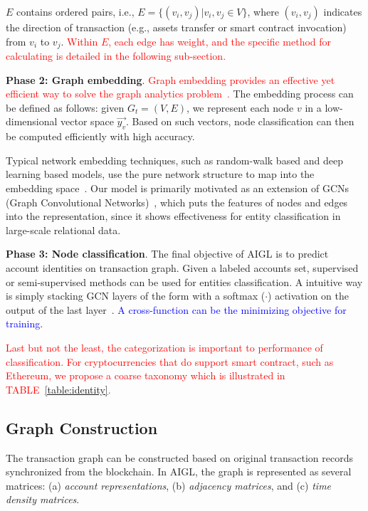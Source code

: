 $E$ contains ordered pairs, i.e., $E=\{(v_i,v_j)|v_i,v_j \in V\}$, where $(v_{i},v_{j})$ indicates the direction of transaction (e.g., assets transfer or smart contract invocation) from $v_i$ to $v_j$. \textcolor{red}{Within $E$, each edge has weight, and the specific method for calculating is detailed in the following sub-section.}


\textbf{Phase 2: Graph embedding}.
\textcolor{red}{Graph embedding provides an effective yet efficient way to solve the graph analytics problem~\cite{cai2018comprehensive}.} The embedding process can be defined as follows: given $G_{t}=(V,E)$, we represent each node $v$ in a low-dimensional vector space $\vec{y_v}$. Based on such vectors, node classification can then be computed efficiently with high accuracy.

Typical network embedding techniques, such as random-walk based and deep learning based models, use the pure network structure to map into the embedding space~\cite{goyal2018capturing}. Our model is primarily motivated as an extension of GCNs (Graph Convolutional Networks)~\cite{kipf2016semi,schlichtkrull2018modeling}, which puts the features of nodes and edges into the representation, since it shows effectiveness for entity classification in large-scale relational data.


\textbf{Phase 3: Node classification}.
The final objective of AIGL is to predict account identities on transaction graph. Given a labeled accounts set, supervised or semi-supervised methods can be used for entities classification. A intuitive way is simply stacking GCN layers of the form with a softmax ($\cdot$) activation on the output of the last layer~\cite{schlichtkrull2018modeling}. \textcolor{blue}{A cross-function can be the minimizing objective for training.}

\textcolor{red}{Last but not the least, the categorization is important to performance of classification. For cryptocurrencies that do support smart contract, such as Ethereum, we propose a coarse taxonomy which is illustrated in TABLE~\ref{table:identity}.} 


\subsection{Graph Construction}
The transaction graph can be constructed based on original transaction records synchronized from the blockchain. In AIGL, the graph is represented as several matrices: (a) \emph{account representations}, (b) \emph{adjacency matrices}, and (c) \emph{time density matrices}.



